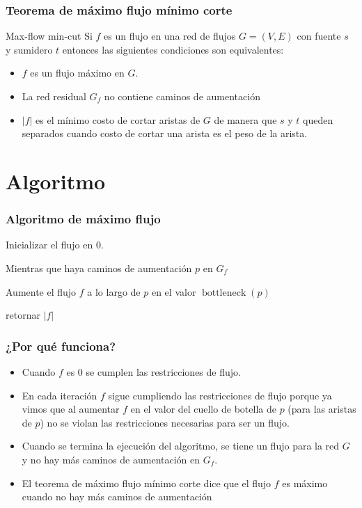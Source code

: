 \documentclass{beamer}
\begin{document}
		\begin{frame}
			\frametitle{Teorema de máximo flujo mínimo corte}
			\begin{block}{Max-flow min-cut}
				Si $f$ es un flujo en una red de flujos $G = (V, E)$ con fuente $s$ y sumidero $t$ entonces las siguientes condiciones son equivalentes:
				\begin{itemize}
					\item $f$ es un flujo máximo en $G$.
					\item La red residual $G_f$ no contiene caminos de aumentación
					\item $|f|$ es el mínimo costo de cortar aristas de $G$ de manera que $s$ y $t$ queden separados cuando costo de cortar una arista es el peso de la arista.
				\end{itemize}
			\end{block}
		\end{frame}
	
\section{Algoritmo}
	
	\begin{frame}
		\frametitle{Algoritmo de máximo flujo}
		\begin{enumerate}
			\item Inicializar el flujo en 0.
			\item Mientras que haya caminos de aumentación $p$ en $G_f$
			{\setlength\itemindent{15pt} \item Aumente el flujo $f$ a lo largo de $p$ en el valor $\operatorname{bottleneck}(p)$}
			\item retornar $|f|$
		\end{enumerate}
	\end{frame}
	
	\begin{frame}
		\frametitle{¿Por qué funciona?}
		\begin{itemize}
			\item Cuando $f$ es 0 se cumplen las restricciones de flujo.
			\item En cada iteración $f$ sigue cumpliendo las restricciones de flujo porque ya vimos que al aumentar $f$ en el valor del cuello de botella de $p$ (para las aristas de $p$) no se violan las restricciones necesarias para ser un flujo.
			\item Cuando se termina la ejecución del algoritmo, se tiene un flujo para la red $G$ y no hay más caminos de aumentación en $G_f$.
			\item El teorema de máximo flujo mínimo corte dice que el flujo $f$ es máximo cuando no hay más caminos de aumentación
		\end{itemize}
	\end{frame}
	
\end{document}
